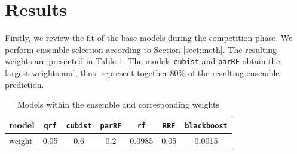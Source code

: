 \documentclass[12pt]{article}
\begin{document}
\section{Results}
Firstly, we review the fit of the base models during the competition phase. We perform ensemble selection according to Section \ref{sect:meth}. The resulting weights are presented in Table \ref{tab:compens}. The models \texttt{cubist} and \texttt{parRF} obtain the largest weights and, thus, represent together 80\% of the resulting ensemble prediction.

\begin{table}
	\centering
	\begin{tabular}{l|cccccc}
		\hline
		\hline
		model &\texttt{qrf} & \texttt{cubist} & \texttt{parRF} & \texttt{rf} & \texttt{RRF} & \texttt{blackboost} \\ \hline
		weight & 0.05 & 0.6 & 0.2 & 0.0985 & 0.05 & 0.0015\\
		\hline
		\hline
	\end{tabular}
	\caption{Models within the ensemble and corresponding weights}
	\label{tab:compens}
\end{table}
\end{document}
